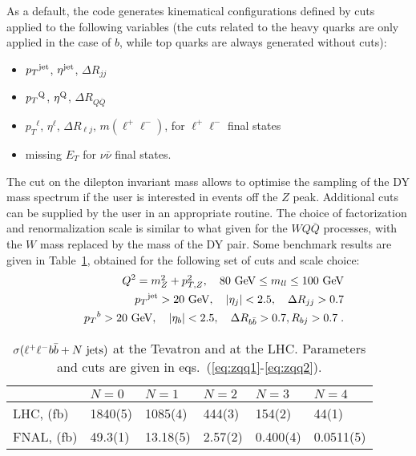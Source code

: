 \documentclass[paper]{JHEP3}
\newcommand{\gev}{\mbox{GeV}}
\newcommand{\ccaption}[2]{
    \begin{center}
    \parbox{0.85\textwidth}{
      \caption[#1]{\small{{#2}}}
      }
    \end{center}
    }
\def    \ba             {\begin{eqnarray}}
\def    \ea             {\end{eqnarray}}
\def    \gev            {\mbox{$\mathrm{GeV}$}}
\def    \bbar   {\bar{b}}
\def    \Qbar   {\overline{Q}}
\def    \mZsq             {\mbox{$m_Z^2$} }
\def    \pt             {\mbox{$p_T$}}
\def    \ptZsq           {\mbox{$p^2_{T,Z}$}}
\begin{document}
As a default, the code generates kinematical configurations defined by
cuts applied to the following variables (the cuts related to the heavy
quarks are only applied in the case of $b$, while top quarks are
always generated without cuts):
\begin{itemize}
\item $\pt^{\rm jet}$, $\eta^{\rm jet}$, $\Delta R_{jj}$
\item $\pt^{\rm Q}$, $\eta^{\rm Q}$, $\Delta R_{Q\Qbar}$ 
\item $\pt^{\ell}$, $\eta^{\ell}$, $\Delta R_{\ell j}$, $m(\ell^+\ell^-)$, 
for $\ell^+ \ell^-$ final states
\item missing $E_T$ for $\nu \bar\nu$ final states.  
\end{itemize}
The cut on the dilepton invariant mass allows to optimise the sampling
of the DY mass spectrum if the user is interested in events off the
$Z$ peak. Additional cuts can be supplied by the user in an
appropriate routine.  The choice of factorization and renormalization
scale is similar to what given for the $WQ\Qbar$ processes, with the
$W$ mass replaced by the mass of the DY pair.
Some benchmark results are given in Table~\ref{tab:zqqxs}, obtained
for the following set of cuts and scale choice:
\ba \label{eq:zqq1}
&& Q^2 = \mZsq + \ptZsq,
\quad
80~\gev \leq m_{ll} \leq 100~\gev
\\
        && \pt^{\rm jet}>20~\gev, \quad \vert \eta_j\vert < 2.5, \quad \Delta
        R_{jj} >0.7
\\
        && \pt^{b}>20~\gev, \quad \vert \eta_b \vert < 2.5, \quad \Delta
        R_{b\bbar} >0.7, R_{bj} >0.7 \; .
\label{eq:zqq2}
\ea
{\renewcommand{\arraystretch}{1.2}
\begin{table}
\begin{center}
\begin{tabular}{||l|l|l|l|l|l||}\hline
 & $N = 0$  & $N = 1$ & $N = 2$ & $N = 3$ & $N = 4$\\ 
\hline
LHC, (fb) & 1840(5)  & 1085(4) & 444(3) &  154(2) & 44(1) \\ 
\hline
FNAL, (fb) & 49.3(1) & 13.18(5) & 2.57(2) & 0.400(4) & 0.0511(5) \\ 
\hline
\end{tabular}            
\ccaption{}{\label{tab:zqqxs}
$\sigma(\ell^+ \ell^- b \bbar + N~{\rm jets})$
at the Tevatron and at the LHC. Parameters and cuts are given
in eqs.~(\ref{eq:zqq1}-\ref{eq:zqq2}).}
\end{center}
\end{table}}
\end{document}
